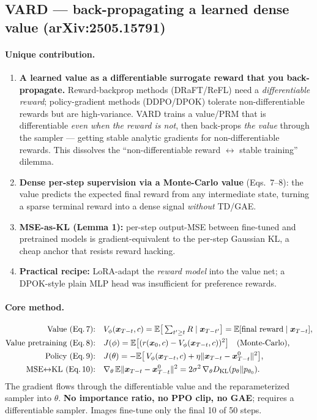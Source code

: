 \documentclass[11pt]{article}
\theoremstyle{remark}
\newcommand{\xt}{\bm{x}}
\newcommand{\E}{\mathbb{E}}
\newcommand{\Vphi}{V_\phi}
\begin{document}
\subsection{VARD --- back-propagating a learned dense value (arXiv:2505.15791)}
\label{sec:vard}

\paragraph{Unique contribution.}
\begin{enumerate}[leftmargin=1.6em]
  \item \textbf{A learned value as a differentiable surrogate reward that you
  back-propagate.} Reward-backprop methods (DRaFT/ReFL) need a \emph{differentiable
  reward}; policy-gradient methods (DDPO/DPOK) tolerate non-differentiable rewards but
  are high-variance. VARD trains a value/PRM that is differentiable \emph{even when the
  reward is not}, then back-props \emph{the value} through the sampler --- getting stable
  analytic gradients for non-differentiable rewards. This dissolves the
  ``non-differentiable reward $\leftrightarrow$ stable training'' dilemma.
  \item \textbf{Dense per-step supervision via a Monte-Carlo value} (Eqs.\ 7--8): the
  value predicts the expected final reward from any intermediate state, turning a
  sparse terminal reward into a dense signal \emph{without} TD/GAE.
  \item \textbf{MSE-as-KL (Lemma 1):} per-step output-MSE between fine-tuned and
  pretrained models is gradient-equivalent to the per-step Gaussian KL, a cheap anchor
  that resists reward hacking.
  \item \textbf{Practical recipe:} LoRA-adapt the \emph{reward model} into the value
  net; a DPOK-style plain MLP head was insufficient for preference rewards.
\end{enumerate}

\paragraph{Core method.}
\begin{align}
\text{Value (Eq.\,7):}\quad
  &\Vphi(\xt_{T-t},c)=\E\big[\textstyle\sum_{t'\ge t}R\mid\xt_{T-t'}\big]
   =\E[\text{final reward}\mid\xt_{T-t}], \\
\text{Value pretraining (Eq.\,8):}\quad
  &J(\phi)=\E\big[(r(\xt_0,c)-\Vphi(\xt_{T-t},c))^2\big]\quad\text{(Monte-Carlo)}, \\
\text{Policy (Eq.\,9):}\quad
  &J(\theta)=-\E\big[\,\Vphi(\xt_{T-t},c)+\eta\lVert \xt_{T-t}-\xt^0_{T-t}\rVert^2\big],\\
\text{MSE$\leftrightarrow$KL (Eq.\,10):}\quad
  &\nabla_\theta\,\E\lVert\xt_{T-t}-\xt^0_{T-t}\rVert^2
   =2\sigma^2\,\nabla_\theta D_{\mathrm{KL}}(p_\theta\Vert p_{\theta_0}).
\end{align}
The gradient flows through the differentiable value and the reparameterized sampler
into $\theta$. \textbf{No importance ratio, no PPO clip, no GAE}; requires a
differentiable sampler. Images fine-tune only the final 10 of 50 steps.
\end{document}
